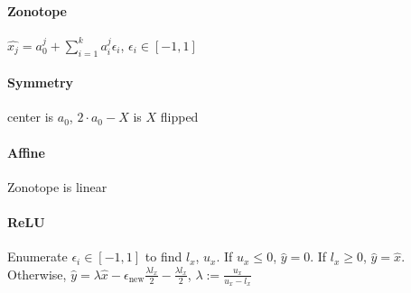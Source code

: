 \paragraph{Zonotope} $\hat{x_j} = a_0^j + \sum_{i=1}^k a_i^j \epsilon_i$, $\epsilon_i \in [-1, 1]$
\paragraph{Symmetry} center is $a_0$, $2 \cdot a_0 - X$ is $X$ flipped
\paragraph{Affine} Zonotope is linear
\paragraph{ReLU} Enumerate $\epsilon_i \in [-1,1]$ to find $l_x$, $u_x$. 
If $u_x \le 0$, $\hat{y} = 0$. If $l_x \ge 0$, $\hat{y} = \hat{x}$. 
Otherwise, $\hat{y} = \lambda \hat{x} - \epsilon_\text{new} \frac{\lambda l_x}{2} - \frac{\lambda l_x}{2}$, $\lambda := \frac{u_x}{u_x-l_x}$